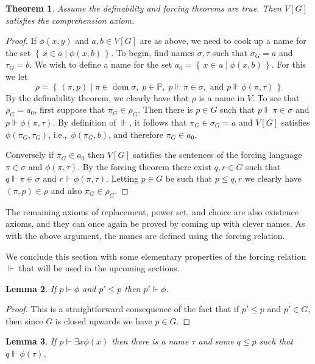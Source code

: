 \documentclass[11pt,oneside]{amsbook}
\newcommand{\set}[1]{\left\{\,#1\,\right\}}
\newcommand{\forces}{\Vdash}
\DeclareMathOperator{\dom}{dom}
\theoremstyle{definition}
\theoremstyle{plain}
\newtheorem{thm}{Theorem}[section]
\newtheorem{lem}[thm]{Lemma}
\theoremstyle{definition}
\theoremstyle{remark}
\begin{document}
\begin{thm}
  Assume the definability and forcing theorems are true. Then $V[G]$ satisfies the comprehension axiom.
\end{thm}

\begin{proof}
  If $\phi(x,y)$ and $a,b\in V[G]$ are as above, we need to cook up a name for the set $\set{x\in a\mid\phi(x,b)}$. To begin, find names $\sigma,\tau$ such that $\sigma_G=a$ and $\tau_G=b$. We wish to define a name for the set $a_0=\set{x\in a\mid\phi(x,b)}$. For this we let
  \[\rho=\set{(\pi,p)\mid\pi\in\dom\sigma,\;p\in\mathbb P,\;p\forces\pi\in\sigma,\text{ and }p\forces\phi(\pi,\tau)}
  \]
  By the definability theorem, we clearly have that $\rho$ is a name in $V$. To see that $\rho_G=a_0$, first suppose that $\pi_G\in\rho_G$. Then there is $p\in G$ such that $p\forces\pi\in\sigma$ and $p\forces\phi(\pi,\tau)$. By definition of $\forces$, it follows that $\pi_G\in\sigma_G=a$ and $V[G]$ satisfies $\phi(\pi_G,\tau_G)$, i.e.,\ $\phi(\pi_G,b)$, and therefore $\pi_G\in a_0$.

  Conversely if $\pi_G\in a_0$ then $V[G]$ satisfies the sentences of the forcing language $\pi\in\sigma$ and $\phi(\pi,\tau)$. By the forcing theorem there exist $q,r\in G$ such that $q\forces\pi\in\sigma$ and $r\forces\phi(\pi,\tau)$. Letting $p\in G$ be such that $p\leq q,r$ we clearly have $(\pi,p)\in\rho$ and also $\pi_G\in\rho_G$.
\end{proof}

The remaining axioms of replacement, power set, and choice are also existence axioms, and they can once again be proved by coming up with clever names. As with the above argument, the names are defined using the forcing relation.

We conclude this section with some elementary properties of the forcing relation $\forces$ that will be used in the upcoming sections.

\begin{lem}
  If $p\forces\phi$ and $p'\leq p$ then $p'\forces\phi$.
\end{lem}

\begin{proof}
  This is a straightforward consequence of the fact that if $p'\leq p$ and $p'\in G$, then since $G$ is closed upwards we have $p\in G$.
\end{proof}

\begin{lem}
  If $p\forces\exists x\phi(x)$ then there is a name $\tau$ and some $q\leq p$ such that $q\forces\phi(\tau)$.
\end{lem}
\end{document}
